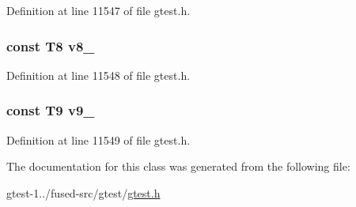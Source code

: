 \-Definition at line 11547 of file gtest.\-h.

\hypertarget{classtesting_1_1internal_1_1ValueArray26_a596bc5260b2474271d1f6910ff6f665d}{
\subsubsection[{v8\-\_\-}]{\setlength{\rightskip}{0pt plus 5cm}const \-T8 {\bf v8\-\_\-}}}\label{dc/d28/classtesting_1_1internal_1_1ValueArray26_a596bc5260b2474271d1f6910ff6f665d}


\-Definition at line 11548 of file gtest.\-h.

\hypertarget{classtesting_1_1internal_1_1ValueArray26_a6356e16cf54a9dfac8525f20242af31e}{
\subsubsection[{v9\-\_\-}]{\setlength{\rightskip}{0pt plus 5cm}const \-T9 {\bf v9\-\_\-}}}\label{dc/d28/classtesting_1_1internal_1_1ValueArray26_a6356e16cf54a9dfac8525f20242af31e}


\-Definition at line 11549 of file gtest.\-h.



\-The documentation for this class was generated from the following file\-:\begin{DoxyCompactItemize}
\item 
gtest-\/1../fused-\/src/gtest/\hyperlink{fused-src_2gtest_2gtest_8h}{gtest.\-h}\end{DoxyCompactItemize}
